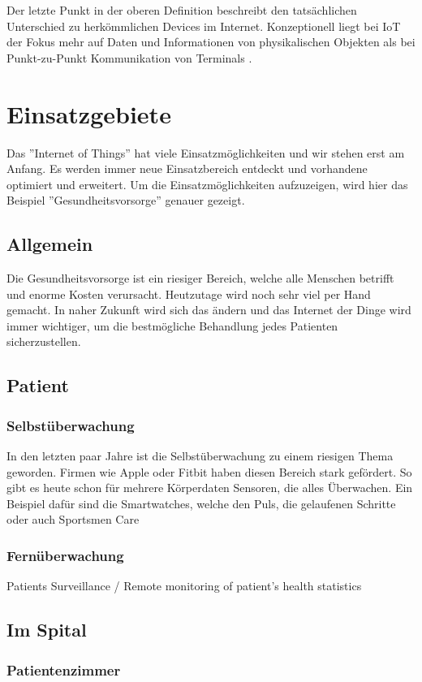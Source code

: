 Der letzte Punkt in der oberen Definition beschreibt den tatsächlichen Unterschied zu herkömmlichen Devices im Internet. Konzeptionell liegt bei IoT der Fokus mehr auf Daten und Informationen von physikalischen Objekten als bei Punkt-zu-Punkt Kommunikation von Terminals \cite{MiorandiSicariPellegriniChlamtac12}.





\section{Einsatzgebiete}
Das ''Internet of Things'' hat viele Einsatzmöglichkeiten und wir stehen erst am Anfang. Es werden immer neue Einsatzbereich entdeckt und vorhandene optimiert und erweitert. Um die Einsatzmöglichkeiten aufzuzeigen, wird hier das Beispiel ''Gesundheitsvorsorge'' genauer gezeigt.
\subsection{Allgemein}
Die Gesundheitsvorsorge ist ein riesiger Bereich, welche alle Menschen betrifft und enorme Kosten verursacht. Heutzutage wird noch sehr viel per Hand gemacht. In naher Zukunft wird sich das ändern und das Internet der Dinge wird immer wichtiger, um die bestmögliche Behandlung jedes Patienten sicherzustellen.
\subsection{Patient}
\subsubsection{Selbstüberwachung}
In den letzten paar Jahre ist die Selbstüberwachung zu einem riesigen Thema geworden. Firmen wie Apple oder Fitbit haben diesen Bereich stark gefördert. So gibt es heute schon für mehrere Körperdaten Sensoren, die alles Überwachen. Ein Beispiel dafür sind die Smartwatches, welche den Puls, die gelaufenen Schritte oder auch 
Sportsmen Care
\subsubsection{Fernüberwachung}
Patients Surveillance / Remote monitoring of patient’s health statistics
\subsection{Im Spital}
\subsubsection{Patientenzimmer}
